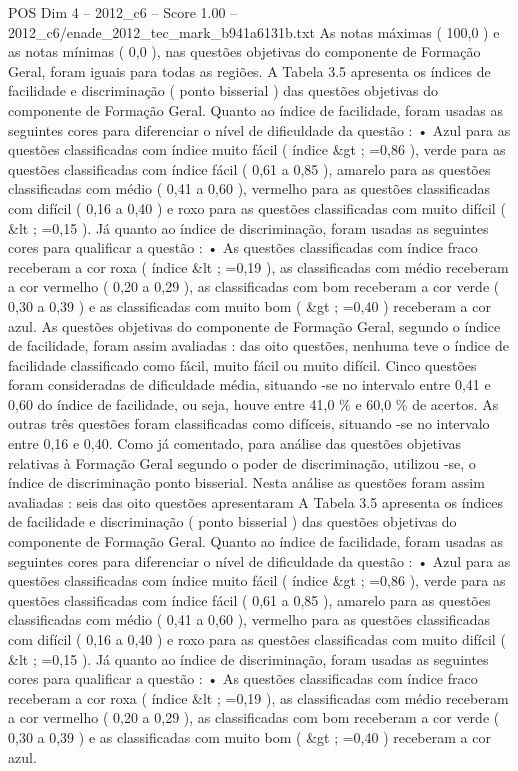 \begin{textsample}{POS Dim 4 – 2012\_c6 – Score 1.00 – 2012\_c6/enade\_2012\_tec\_mark\_b941a6131b.txt}
As notas máximas ( 100,0 ) e as notas mínimas ( 0,0 ), nas questões objetivas do componente de Formação Geral, foram iguais para todas as regiões.
A Tabela 3.5 apresenta os índices de facilidade e discriminação ( ponto bisserial ) das questões objetivas do componente de Formação Geral.
Quanto ao índice de facilidade, foram usadas as seguintes cores para diferenciar o nível de dificuldade da questão : • Azul para as questões classificadas com índice muito fácil ( índice \&gt ; =0,86 ), verde para as questões classificadas com índice fácil ( 0,61 a 0,85 ), amarelo para as questões classificadas com médio ( 0,41 a 0,60 ), vermelho para as questões classificadas com difícil ( 0,16 a 0,40 ) e roxo para as questões classificadas com muito difícil ( \&lt ; =0,15 ).
Já quanto ao índice de discriminação, foram usadas as seguintes cores para qualificar a questão : • As questões classificadas com índice fraco receberam a cor roxa ( índice \&lt ; =0,19 ), as classificadas com médio receberam a cor vermelho ( 0,20 a 0,29 ), as classificadas com bom receberam a cor verde ( 0,30 a 0,39 ) e as classificadas com muito bom ( \&gt ; =0,40 ) receberam a cor azul.
As questões objetivas do componente de Formação Geral, segundo o índice de facilidade, foram assim avaliadas : das oito questões, nenhuma teve o índice de facilidade classificado como fácil, muito fácil ou muito difícil.
Cinco questões foram consideradas de dificuldade média, situando -se no intervalo entre 0,41 e 0,60 do índice de facilidade, ou seja, houve entre 41,0 \% e 60,0 \% de acertos.
As outras três questões foram classificadas como difíceis, situando -se no intervalo entre 0,16 e 0,40.
Como já comentado, para análise das questões objetivas relativas à Formação Geral segundo o poder de discriminação, utilizou -se, o índice de discriminação ponto bisserial.
Nesta análise as questões foram assim avaliadas : seis das oito questões apresentaram A Tabela 3.5 apresenta os índices de facilidade e discriminação ( ponto bisserial ) das questões objetivas do componente de Formação Geral.
Quanto ao índice de facilidade, foram usadas as seguintes cores para diferenciar o nível de dificuldade da questão : • Azul para as questões classificadas com índice muito fácil ( índice \&gt ; =0,86 ), verde para as questões classificadas com índice fácil ( 0,61 a 0,85 ), amarelo para as questões classificadas com médio ( 0,41 a 0,60 ), vermelho para as questões classificadas com difícil ( 0,16 a 0,40 ) e roxo para as questões classificadas com muito difícil ( \&lt ; =0,15 ).
Já quanto ao índice de discriminação, foram usadas as seguintes cores para qualificar a questão : • As questões classificadas com índice fraco receberam a cor roxa ( índice \&lt ; =0,19 ), as classificadas com médio receberam a cor vermelho ( 0,20 a 0,29 ), as classificadas com bom receberam a cor verde ( 0,30 a 0,39 ) e as classificadas com muito bom ( \&gt ; =0,40 ) receberam a cor azul.

\end{textsample}
